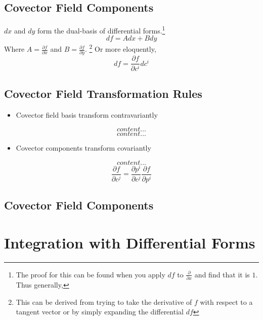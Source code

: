 \subsection{Covector Field Components}
$dx$ and $dy$ form the dual-basis of differential forms.\footnote{The proof for this can be found when you apply $df$ to $\frac{\partial}{\partial x}$ and find that it is $1$. Thus generally, }
$$df = A dx + B dy$$
Where $A = \frac{\partial f}{\partial x}$ and $B = \frac{\partial f}{\partial y}$. \footnote{This can be derived from trying to take the derivative of $f$ with respect to a tangent vector or by simply expanding the differential $df$}
Or more eloquently,
$$df = \frac{\partial f}{\partial c^{i}} dc^{i}$$
\subsection{Covector Field Transformation Rules}
\begin{itemize}
\item Covector field basis transform contravariantly
\end{itemize}
\begin{equation}
	content...
\end{equation}
\begin{equation}
content...
\end{equation}
\begin{itemize}
\item Covector components transform covariantly
\end{itemize}
\begin{equation}
content...
\end{equation}
\begin{equation}
\frac{\partial f}{\partial c^{j}} = \frac{\partial p^{i}}{\partial c^{j}} \frac	{\partial f}{\partial p^{i}}
\end{equation}
\subsection{Covector Field Components}
\section{Integration with Differential Forms}

